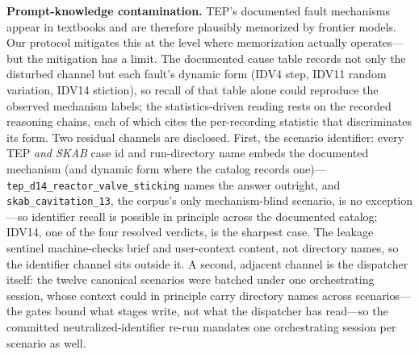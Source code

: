 \documentclass[preprint,12pt]{elsarticle}
\begin{document}
\textbf{Prompt-knowledge contamination.} TEP's documented fault mechanisms appear in textbooks and are therefore plausibly memorized by frontier models. Our protocol mitigates this at the level where memorization actually operates---but the mitigation has a limit. The documented cause table records not only the disturbed channel but each fault's dynamic form (IDV4 step, IDV11 random variation, IDV14 stiction), so recall of that table alone could reproduce the observed mechanism labels; the statistics-driven reading rests on the recorded reasoning chains, each of which cites the per-recording statistic that discriminates its form. Two residual channels are disclosed. First, the scenario identifier: every TEP \emph{and SKAB} case id and run-directory name embeds the documented mechanism (and dynamic form where the catalog records one)---\texttt{tep\_d14\_reactor\_valve\_sticking} names the answer outright, and \texttt{skab\_cavitation\_13}, the corpus's only mechanism-blind scenario, is no exception---so identifier recall is possible in principle across the documented catalog; IDV14, one of the four resolved verdicts, is the sharpest case. The leakage sentinel machine-checks brief and user-context content, not directory names, so the identifier channel sits outside it. A second, adjacent channel is the dispatcher itself: the twelve canonical scenarios were batched under one orchestrating session, whose context could in principle carry directory names across scenarios---the gates bound what stages write, not what the dispatcher has read---so the committed neutralized-identifier re-run mandates one orchestrating session per scenario as well.
\end{document}
